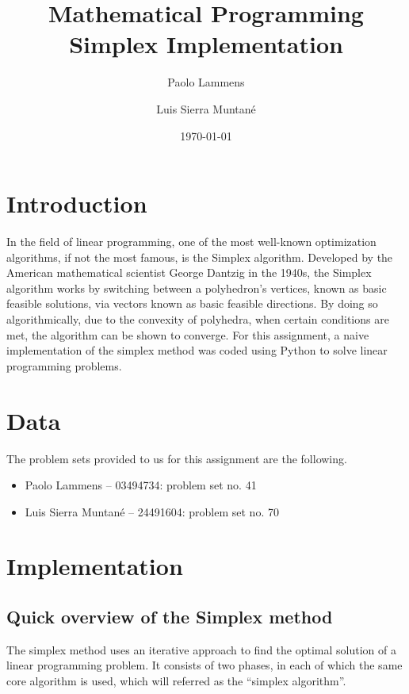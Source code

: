 \documentclass[a4paper]{article}
\title{Mathematical Programming \\ \Large Simplex Implementation}
\author{Paolo Lammens}
\author{Luis Sierra Muntané}
\affil{GM -- FME -- UPC}
\date{\today}
\begin{document}

\maketitle
\thispagestyle{empty}

\pagebreak

\tableofcontents
\thispagestyle{empty}

\newpage

\section{Introduction}

In the field of linear programming, one of the most well-known optimization algorithms, if not the most famous, is the Simplex algorithm. Developed by the American mathematical scientist George Dantzig in the 1940s, the Simplex algorithm works by switching between a polyhedron's vertices, known as basic feasible solutions, via vectors known as basic feasible directions. By doing so algorithmically, due to the convexity of polyhedra, when certain conditions are met, the algorithm can be shown to converge.
For this assignment, a naive implementation of the simplex method was coded using Python to solve linear programming problems.

\section{Data}

The problem sets provided to us for this assignment are the following.
\begin{itemize}
    \item Paolo Lammens -- 03494734: problem set no. 41
    \item Luis Sierra Muntané -- 24491604: problem set no. 70
\end{itemize}

\section{Implementation}
\subsection{Quick overview of the Simplex method}
The simplex method uses an iterative approach to find the optimal solution of a linear programming problem. It consists of two phases, in each of which the same core algorithm is used, which will referred as the ``simplex algorithm''.
\end{document}
